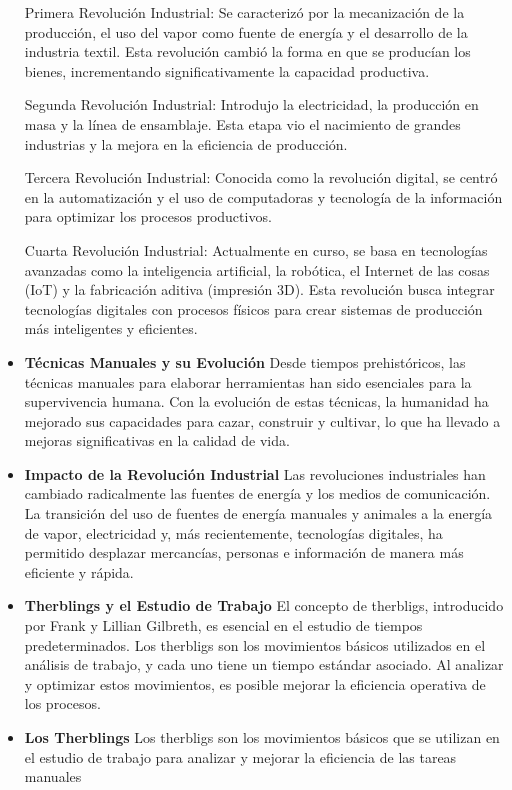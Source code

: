 \begin{itemize}
    Primera Revolución Industrial: Se caracterizó por la mecanización de la producción, el uso del vapor como fuente de energía y el desarrollo de la industria textil. Esta revolución cambió la forma en que se producían los bienes, incrementando significativamente la capacidad productiva.
    
    Segunda Revolución Industrial: Introdujo la electricidad, la producción en masa y la línea de ensamblaje. Esta etapa vio el nacimiento de grandes industrias y la mejora en la eficiencia de producción.
    
    Tercera Revolución Industrial: Conocida como la revolución digital, se centró en la automatización y el uso de computadoras y tecnología de la información para optimizar los procesos productivos.
    
    Cuarta Revolución Industrial: Actualmente en curso, se basa en tecnologías avanzadas como la inteligencia artificial, la robótica, el Internet de las cosas (IoT) y la fabricación aditiva (impresión 3D). Esta revolución busca integrar tecnologías digitales con procesos físicos para crear sistemas de producción más inteligentes y eficientes.\cite{bock}
    
    \item \textbf{Técnicas Manuales y su Evolución}
    Desde tiempos prehistóricos, las técnicas manuales para elaborar herramientas han sido esenciales para la supervivencia humana. Con la evolución de estas técnicas, la humanidad ha mejorado sus capacidades para cazar, construir y cultivar, lo que ha llevado a mejoras significativas en la calidad de vida.
    \item \textbf{Impacto de la Revolución Industrial}
    Las revoluciones industriales han cambiado radicalmente las fuentes de energía y los medios de comunicación. La transición del uso de fuentes de energía manuales y animales a la energía de vapor, electricidad y, más recientemente, tecnologías digitales, ha permitido desplazar mercancías, personas e información de manera más eficiente y rápida.\cite{karube}
    \item \textbf{Therblings y el Estudio de Trabajo}
    El concepto de therbligs, introducido por Frank y Lillian Gilbreth, es esencial en el estudio de tiempos predeterminados. Los therbligs son los movimientos básicos utilizados en el análisis de trabajo, y cada uno tiene un tiempo estándar asociado. Al analizar y optimizar estos movimientos, es posible mejorar la eficiencia operativa de los procesos.
    
    \item \textbf{Los Therblings}
    Los therbligs son los movimientos básicos que se utilizan en el estudio de trabajo para analizar y mejorar la eficiencia de las tareas manuales
    

\end{itemize}
